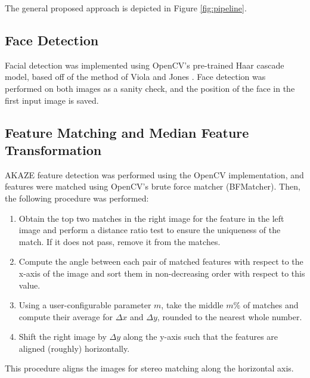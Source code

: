 \documentclass[10pt,twocolumn,letterpaper]{article}
\begin{document}
The general proposed approach is depicted in Figure \ref{fig:pipeline}.

\subsection{Face Detection}

Facial detection was implemented using OpenCV's pre-trained Haar cascade model, based off of the method of Viola and Jones \cite{viola_jones_2004}.
Face detection was performed on both images as a sanity check, and the position of the face in the first input image is saved.

\subsection{Feature Matching and Median Feature Transformation}

AKAZE \cite{alcantarilla_nuevo_bartoli_2013} feature detection was performed using the OpenCV implementation, and features were matched using
OpenCV's brute force matcher (BFMatcher). Then, the following procedure was performed:
\begin{enumerate}
    \item Obtain the top two matches in the right image for the feature in the left image and perform a distance ratio test to ensure the uniqueness of the match. If it does not pass, remove it from the matches.
    \item Compute the angle between each pair of matched features with respect to the x-axis of the image and sort them in non-decreasing order with respect to this value.
    \item Using a user-configurable parameter $m$, take the middle $m\%$ of matches and compute their average for $\Delta x$ and $\Delta y$, rounded to the nearest whole number.
    \item Shift the right image by $\Delta y$ along the y-axis such that the features are aligned (roughly) horizontally.
\end{enumerate}

This procedure aligns the images for stereo matching along the horizontal axis.
\end{document}
